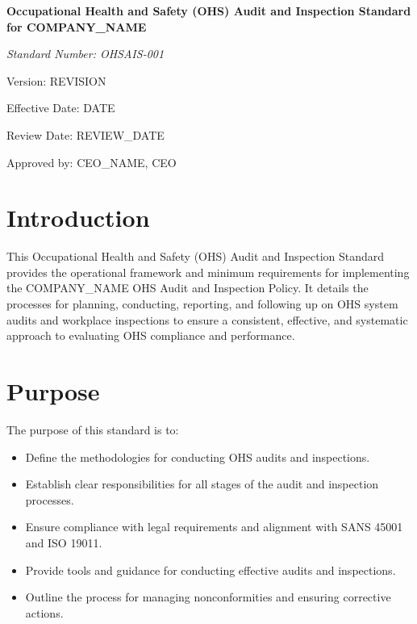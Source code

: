 \documentclass[12pt]{article}
\begin{document}
\begin{titlepage}
    \centering
    \vspace*{2cm}
    {\LARGE\bfseries Occupational Health and Safety (OHS) Audit and Inspection Standard for {{COMPANY_NAME}}\par}
    \vspace{1cm}
    {\large\itshape Standard Number: OHSAIS-001\par}
    \vspace{0.5cm}
    {\normalsize Version: {{REVISION}}\par}
    \vspace{0.5cm}
    {\normalsize Effective Date: {{DATE}}\par}
    \vspace{0.5cm}
    {\normalsize Review Date: {{REVIEW_DATE}}\par}
    \vspace{2cm}
    {\normalsize Approved by: {{CEO_NAME}}, CEO\par}
\end{titlepage}

\section{Introduction}
This Occupational Health and Safety (OHS) Audit and Inspection Standard provides the operational framework and minimum requirements for implementing the {{COMPANY_NAME}} OHS Audit and Inspection Policy. It details the processes for planning, conducting, reporting, and following up on OHS system audits and workplace inspections to ensure a consistent, effective, and systematic approach to evaluating OHS compliance and performance.

\section{Purpose}
The purpose of this standard is to:
\begin{itemize}
    \item Define the methodologies for conducting OHS audits and inspections.
    \item Establish clear responsibilities for all stages of the audit and inspection processes.
    \item Ensure compliance with legal requirements and alignment with SANS 45001 and ISO 19011.
    \item Provide tools and guidance for conducting effective audits and inspections.
    \item Outline the process for managing nonconformities and ensuring corrective actions.
\end{itemize}
\end{document}
